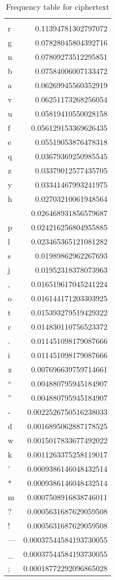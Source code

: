 \documentclass[11pt]{article}
\begin{document}
\begin{table}[htb]
\caption{Frequency table for ciphertext}
\centering
\begin{tabular}{lr}
 & \\
r & 0.11394781302797072\\
g & 0.07828045804392716\\
n & 0.07809273512295851\\
b & 0.07584006007133472\\
a & 0.06269945560352919\\
v & 0.06251173268256054\\
u & 0.05819410550028158\\
f & 0.056129153369626435\\
e & 0.05519053876478318\\
q & 0.03679369250985545\\
z & 0.03379012577435705\\
y & 0.03341467993241975\\
h & 0.02703210061948564\\
\n & 0.026468931856579687\\
p & 0.024216256804955885\\
l & 0.023465365121081282\\
s & 0.01989862962267693\\
j & 0.01952318378073963\\
, & 0.016519617045241224\\
o & 0.016144171203303925\\
t & 0.015393279519429322\\
c & 0.014830110756523372\\
. & 0.011451098179087666\\
i & 0.011451098179087666\\
x & 0.007696639759714661\\
“ & 0.004880795945184907\\
” & 0.004880795945184907\\
- & 0.0022526750516238033\\
d & 0.0016895062887178525\\
w & 0.0015017833677492022\\
k & 0.0011263375258119017\\
’ & 0.0009386146048432514\\
* & 0.0009386146048432514\\
m & 0.0007508916838746011\\
? & 0.0005631687629059508\\
! & 0.0005631687629059508\\
— & 0.00037544584193730055\\
\_ & 0.00037544584193730055\\
; & 0.00018772292096865028\\
\end{tabular}
\end{table}
\end{document}
